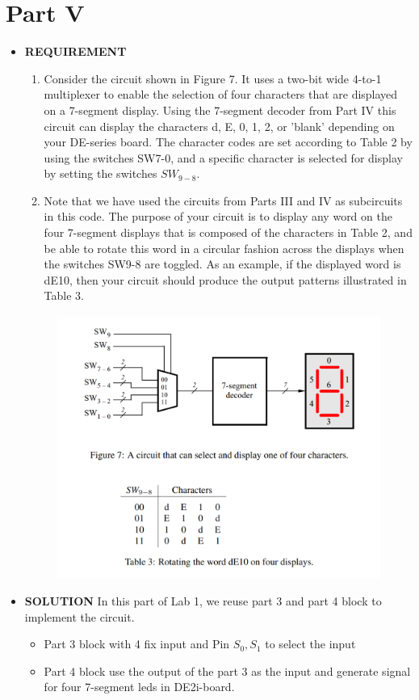 \documentclass[a4paper, 12pt]{report}
\begin{document}
\section{Part V }
\begin{itemize}
    \item [] \textbf{REQUIREMENT}
        \begin{enumerate}
            \item Consider the circuit shown in Figure 7. It uses a two-bit wide 4-to-1 multiplexer to enable the selection of four characters that are displayed on a 7-segment display. Using the 7-segment decoder from Part IV this circuit can display the characters d, E, 0, 1, 2, or 'blank' depending on your DE-series board. The character codes are set according to Table 2 by using the switches SW7-0, and a specific character is selected for display by setting the switches $SW_{9-8}$.
            \item Note that we have used the circuits from Parts III and IV as subcircuits in this code. The purpose of your circuit is to display any word on the four 7-segment displays that is composed of the characters in Table 2, and be able to rotate this word in a circular fashion across the displays when the switches SW9-8 are toggled. As an example, if the displayed word is dE10, then your circuit should produce the output patterns illustrated in Table 3.
        \end{enumerate}
        \begin{figure}[h]
            \centering
            \includegraphics[scale =0.40]{source/picture/Lab1/1-5.png}
        \end{figure}
    \item [] \textbf{SOLUTION} In this part of Lab 1, we reuse part 3 and part 4  block to implement the circuit. 
        \begin{itemize}
            \item [] Part 3 block with 4 fix input and Pin $S_0, S_1$ to select the input
            \item [] Part 4 block use the output of the part 3 as the input and generate signal for four 7-segment leds in DE2i-board.
        \end{itemize}
         
\end{itemize}
\end{document}
